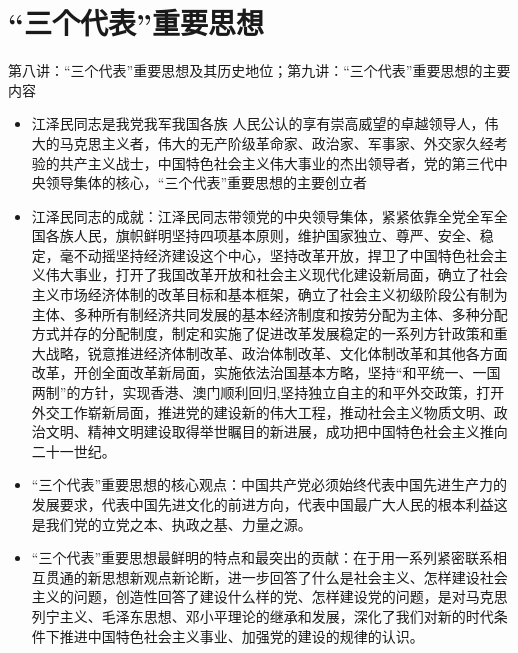 \documentclass[12pt,openany]{ctexbook}
\begin{document}
\section{“三个代表”重要思想}
第八讲：“三个代表”重要思想及其历史地位；第九讲：“三个代表”重要思想的主要内容
\begin{itemize}
  \item 江泽民同志是我党我军我国各族 人民公认的享有崇高威望的卓越领导人，伟大的马克思主义者，伟大的无产阶级革命家、政治家、军事家、外交家久经考验的共产主义战士，中国特色社会主义伟大事业的杰出领导者，党的第三代中央领导集体的核心，“三个代表”重要思想的主要创立者
  \item 江泽民同志的成就：江泽民同志带领党的中央领导集体，紧紧依靠全党全军全国各族人民，旗帜鲜明坚持四项基本原则，维护国家独立、尊严、安全、稳定，毫不动摇坚持经济建设这个中心，坚持改革开放，捍卫了中国特色社会主义伟大事业，打开了我国改革开放和社会主义现代化建设新局面，确立了社会主义市场经济体制的改革目标和基本框架，确立了社会主义初级阶段公有制为主体、多种所有制经济共同发展的基本经济制度和按劳分配为主体、多种分配方式并存的分配制度，制定和实施了促进改革发展稳定的一系列方针政策和重大战略，锐意推进经济体制改革、政治体制改革、文化体制改革和其他各方面改革，开创全面改革新局面，实施依法治国基本方略，坚持“和平统一、一国两制”的方针，实现香港、澳门顺利回归,坚持独立自主的和平外交政策，打开外交工作崭新局面，推进党的建设新的伟大工程，推动社会主义物质文明、政治文明、精神文明建设取得举世瞩目的新进展，成功把中国特色社会主义推向二十一世纪。
  \item “三个代表”重要思想的核心观点：中国共产党必须始终代表中国先进生产力的发展要求，代表中国先进文化的前进方向，代表中国最广大人民的根本利益这是我们党的立党之本、执政之基、力量之源。
  \item “三个代表”重要思想最鲜明的特点和最突出的贡献：在于用一系列紧密联系相互贯通的新思想新观点新论断，进一步回答了什么是社会主义、怎样建设社会主义的问题，创造性回答了建设什么样的党、怎样建设党的问题，是对马克思列宁主义、毛泽东思想、邓小平理论的继承和发展，深化了我们对新的时代条件下推进中国特色社会主义事业、加强党的建设的规律的认识。
\end{itemize}
\end{document}
